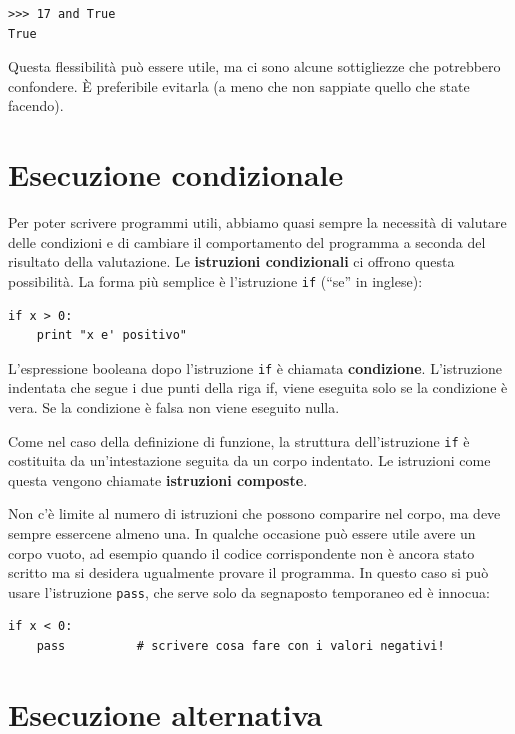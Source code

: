 \documentclass[10pt]{book}
\begin{document}
\begin{verbatim}
>>> 17 and True
True
\end{verbatim}
%
Questa flessibilità può essere utile, ma ci sono alcune sottigliezze che potrebbero confondere. È preferibile evitarla (a meno che non sappiate quello che state facendo).


\section{Esecuzione condizionale}
\label{conditional.execution}

Per poter scrivere programmi utili, abbiamo quasi sempre la necessità  di valutare delle condizioni e di cambiare il comportamento del programma a seconda del risultato della valutazione. Le {\bf istruzioni condizionali} ci offrono questa possibilità. La forma più semplice è l'istruzione {\tt if} (``se'' in inglese):

\begin{verbatim}
if x > 0:
    print "x e' positivo"
\end{verbatim}
%
L'espressione booleana dopo l'istruzione {\tt if} è chiamata {\bf condizione}.  L'istruzione indentata che segue i due punti della riga if, viene eseguita solo se la condizione è vera. Se la condizione è falsa non viene eseguito nulla.

Come nel caso della definizione di funzione, la struttura dell'istruzione {\tt if} è costituita da un'intestazione seguita da un corpo indentato. Le istruzioni come questa vengono chiamate {\bf istruzioni composte}.

Non c'è limite al numero di istruzioni che possono comparire nel corpo, ma deve sempre essercene almeno una. In qualche occasione può essere utile avere un corpo vuoto, ad esempio quando il codice corrispondente non è ancora stato scritto ma si desidera ugualmente provare il programma. In questo caso si può   usare l'istruzione {\tt pass}, che serve solo da segnaposto temporaneo ed è innocua:

\begin{verbatim}
if x < 0:
    pass          # scrivere cosa fare con i valori negativi!
\end{verbatim}
%

\section{Esecuzione alternativa}
\label{alternative.execution}
\end{document}
